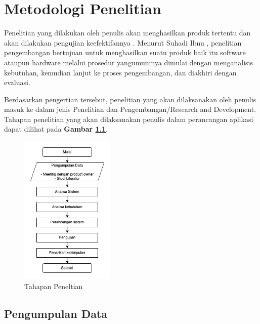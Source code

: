 
\chapter{Metodologi Penelitian}

Penelitian yang dilakukan oleh penulis akan menghasilkan produk tertentu dan akan dilakukan pengujian keefektifannya \citep{purnama2013metodepenelitian}. Menurut Suhadi Ibnu \citep{purnama2013metodepenelitian}, penelitian pengembangan bertujuan untuk menghasilkan suatu produk baik itu software ataupun hardware melalui prosedur yangumumnya dimulai dengan menganalisis kebutuhan, kemudian lanjut ke proses pengembangan, dan diakhiri dengan evaluasi.

Berdasarkan pengertian tersebut, penelitian yang akan dilaksanakan oleh penulis masuk ke dalam jenis Penelitian dan Pengembangan/Research and Development. Tahapan penelitian yang akan dilaksanakan penulis dalam perancangan aplikasi dapat dilihat pada \textbf{Gambar \ref{fig:tahapan_penelitian}}.

\begin{figure}[H]
	\centering
	\includegraphics[width=0.4\textwidth]{gambar/tahapanpenelitian}
	\caption{Tahapan Peneltian}
	\label{fig:tahapan_penelitian}
\end{figure}


\section{Pengumpulan Data}

